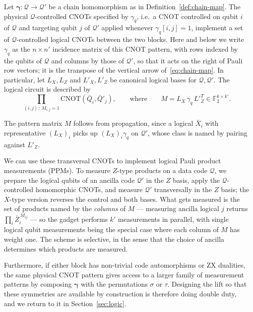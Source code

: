 \begin{definition}\label{def:homomorphic-cnot}
Let $\mathbf \gamma: \mathcal Q \to \mathcal Q'$ be a chain homomorphism as in Definition~\ref{def:chain-map}. The physical $\mathcal Q$-controlled CNOTs specified by $\gamma_q$, i.e.\ a CNOT controlled on qubit $i$ of $\mathcal Q$ and targeting qubit $j$ of $\mathcal Q'$ applied whenever $\gamma_q[i,j] = 1$, implement a set of $\mathcal Q$-controlled logical CNOTs between the two blocks. Here and below we write $\gamma_q$ as the $n\times n'$ incidence matrix of this CNOT pattern, with rows indexed by the qubits of $\mathcal Q$ and columns by those of $\mathcal Q'$, so that it acts on the right of Pauli row vectors; it is the transpose of the vertical arrow of~\eqref{eq:chain-map}. In particular, let $L_X, L_Z$ and $L'_X, L'_Z$ be canonical logical bases for
$\mathcal Q, \mathcal Q'$. The logical circuit is described by
\[
    \prod_{(i,j)\,:\,M_{i,j} = 1} \mathrm{CNOT}(\bar Q_i, \bar Q'_j),
    \qquad\text{where}\qquad
    M = L_X\,\gamma_q\, L'^T_Z \in \mathbb F_2^{k\times k'}.
\]
\end{definition}

The pattern matrix $M$ follows from propagation, since a logical $\bar X_i$ with representative $(L_X)_i$ picks up $(L_X)_i\gamma_q$ on $\mathcal Q'$, whose class is named by pairing against $L'_Z$.
 
We can use these transversal CNOTs to implement logical Pauli product measurements (PPMs). To measure $Z$-type products on a data code $\mathcal Q$, we prepare the logical qubits of an ancilla code $\mathcal Q'$ in the $Z$ basis, apply the $\mathcal Q$-controlled homomorphic CNOTs, and measure $\mathcal Q'$ transversally in the $Z$ basis; the $X$-type version reverses the control and both bases. What gets measured is the set of products named by the \emph{columns} of $M$ --- measuring ancilla logical $j$ returns $\prod_i\bar Z_i^{\,M_{ij}}$ --- so the gadget performs $k'$ measurements in parallel, with single logical qubit measurements being the special case where each column of $M$ has weight one. The scheme is selective, in the sense that the choice of ancilla determines which products are measured.
 
Furthermore, if either block has non-trivial code automorphisms or ZX dualities, the same physical CNOT pattern gives access to a larger family of measurement patterns by composing $\mathbf\gamma$ with the permutations $\sigma$ or $\tau$. Designing the lift so that these symmetries are available by construction is therefore doing double duty, and we
return to it in Section~\ref{sec:logic}.

